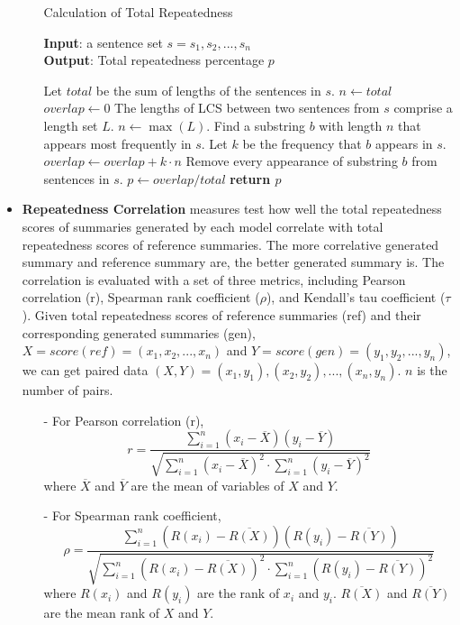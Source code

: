 \begin{itemize}
\begin{itemize}
\begin{algorithm}[th]
\caption{Calculation of Total Repeatedness}
\small
\label{alg:red}
\textbf{Input}: a sentence set $s = {s_{1}, s_{2},...,s_{n}}$\\
\textbf{Output}: Total repeatedness percentage $p$
\begin{algorithmic}[1] %
\STATE Let $total$ be the sum of lengths of the sentences in $s$.
\STATE $n \leftarrow total$
\STATE $overlap \leftarrow 0$
\STATE The lengths of LCS between two sentences from $s$ comprise a length set $L$.
\STATE $n \leftarrow \max(L)$.
\STATE Find a substring $b$ with length $n$ that appears most frequently in $s$.
\STATE Let $k$ be the frequency that $b$ appears in $s$.
\STATE $overlap \leftarrow overlap + k\cdot n$
\STATE Remove every appearance of substring $b$ from sentences in $s$.
\ENDWHILE
\STATE $p \leftarrow overlap/total$
\STATE \textbf{return $p$} 
\end{algorithmic}
\end{algorithm}
\end{itemize}

\item \textbf{Repeatedness Correlation} 
measures test how well 
the total repeatedness scores of summaries generated by each model
correlate with total repeatedness scores of reference summaries. 
The more correlative generated summary and reference summary are,
the better generated summary is.
The correlation is evaluated with a set of
three metrics, including Pearson correlation (r),
Spearman rank coefficient ($\rho$), and Kendall's tau coefficient ($\tau$).
Given total repeatedness scores of reference summaries (ref) and 
their corresponding generated summaries (gen),
$X=score(ref)=(x_1, x_2,..., x_n)$ and 
$Y=score(gen)=(y_1, y_2,..., y_n)$, 
we can get paired data $(X,Y)={(x_1, y_1), (x_2, y_2),..., (x_n, y_n)}$.
$n$ is the number of pairs.
\begin{itemize}	
\item[-] For Pearson correlation (r),
\begin{equation}
r = \frac{\sum_{i=1}^{n}(x_i - \overline{X})(y_i - \overline{Y})}
	{\sqrt{\sum_{i=1}^{n}(x_i - \overline{X})^{2}\cdot\sum_{i=1}^{n}(y_i - \overline{Y})^{2}}}
\end{equation}
where $\overline{X}$ and $\overline{Y}$ are the mean of variables of $X$ and $Y$.

\item[-] For Spearman rank coefficient,
\begin{equation}
\rho = \frac{\sum_{i=1}^{n}(R(x_i) - \overline{R(X)})(R(y_i) - \overline{R(Y)})}
	  {\sqrt{\sum_{i=1}^{n}(R(x_i) - \overline{R(X)})^{2}
	  \cdot\sum_{i=1}^{n}(R(y_i)-\overline{R(Y)})^{2}}}
\end{equation}
where $R(x_i)$ and $R(y_i)$ are the rank of $x_i$ and $y_i$.
$\overline{R(X)}$ and $\overline{R(Y)}$ are the mean rank of $X$ and $Y$.


\end{itemize}
\end{itemize}
